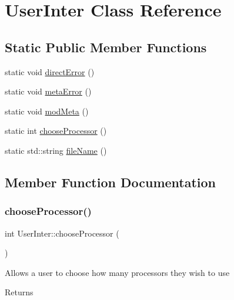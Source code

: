 \hypertarget{classUserInter}{}\section{User\+Inter Class Reference}
\label{classUserInter}
\subsection*{Static Public Member Functions}
\begin{DoxyCompactItemize}
\item 
static void \hyperlink{classUserInter_a7c97e2b0c84c415b3e4217c6f8d0bb2b}{direct\+Error} ()
\item 
static void \hyperlink{classUserInter_a1a0d0dbcb309e71c900e7a7fcc933099}{meta\+Error} ()
\item 
static void \hyperlink{classUserInter_ac64d3bb2f75081f223be74880149d9ea}{mod\+Meta} ()
\item 
static int \hyperlink{classUserInter_aae57e89c6d6bdf607782ec551a4682df}{choose\+Processor} ()
\item 
static std\+::string \hyperlink{classUserInter_a756f309337489c85e3331077fad3cc0b}{file\+Name} ()
\end{DoxyCompactItemize}


\subsection{Member Function Documentation}
\mbox{\label{classUserInter_aae57e89c6d6bdf607782ec551a4682df}} 
\subsubsection{\texorpdfstring{choose\+Processor()}{chooseProcessor()}}
{\footnotesize\ttfamily int User\+Inter\+::choose\+Processor (\begin{DoxyParamCaption}{ }\end{DoxyParamCaption})\hspace{0.3cm}{\ttfamily [static]}}

Allows a user to choose how many processors they wish to use \begin{DoxyReturn}{Returns}

\end{DoxyReturn}
\mbox{\label{classUserInter_a7c97e2b0c84c415b3e4217c6f8d0bb2b}} 
